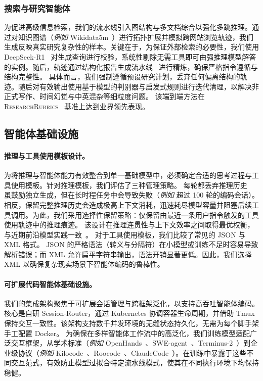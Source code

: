 \subsubsection{搜索与研究智能体}


为促进高级信息检索，我们的流水线引入图结构与多文档综合以强化多跳推理。通过对知识图谱（\textit{例如} Wikidata5m~\cite{wang2021kepler}）进行拓扑扩展并模拟跨网站浏览轨迹，我们生成反映真实研究复杂性的样本。关键在于，为保证外部检索的必要性，我们使用 DeepSeek-R1~\cite{Guo_2025} 对生成查询进行校验，系统性剔除无需工具即可由强推理模型解答的实例。随后，轨迹通过结构化报告生成流水线~\cite{hu2025stepdeepresearchtechnicalreport} 进行精炼，确保严格指令遵循与结构完整性。
具体而言，我们强制遵循预设研究计划，丢弃任何偏离结构的轨迹。随后对有效输出使用基于模型的判别器与启发式规则进行迭代清理，以解决非正式写作、时间幻觉与中英混杂等细粒度问题。
该端到端方法在 \textsc{ResearchRubrics}~\cite{sharma2025researchrubrics} 基准上达到业界领先表现。


\subsection{智能体基础设施}
\paragraph{推理与工具使用模板设计。}
为将推理与智能体能力有效整合到单一基础模型中，必须确定合适的思考过程与工具使用模板。针对推理模板，我们评估了三种管理策略。
每轮都丢弃推理历史~\cite{Guo_2025} 虽鼓励独立生成，但在长时程任务中会导致失败（\textit{例如} 超过 100 轮的编码会话）。相反，保留完整推理历史会造成极高上下文消耗，迅速耗尽模型容量并阻塞后续工具调用。为此，我们采用选择性保留策略：仅保留由最近一条用户指令触发的工具使用轨迹中的推理痕迹。
该设计在推理连贯性与上下文效率之间取得最优权衡，与近期前沿模型实践一致~\cite{yang2025qwen3technicalreport,liu2025deepseek}。
对于工具使用模板，我们比较了常见的 JSON 与 XML 格式。
JSON 的严格语法（转义与分隔符）在小模型或训练不足时容易导致解析错误；而 XML 允许扁平字符串输出，语法开销显著更低。因此，我们选择 XML 以确保复杂现实场景下智能体编码的鲁棒性。


\paragraph{可扩展代码智能体基础设施。}
我们的集成架构聚焦于可扩展会话管理与跨框架泛化，以支持高吞吐智能体编码。核心是自研 Session-Router，通过 Kubernetes 协调容器生命周期，并借助 Tmux 保持交互一致性。该架构支持数千并发环境的无缝状态持久化，无需为每个脚手架手工配置 Docker。
为确保在多样智能体工作流中的高泛化，我们训练模型适配广泛交互框架，从学术标准（\textit{例如} OpenHands~\cite{wang2024openhands}、SWE-agent~\cite{yang2024swe}、Terminus-2~\cite{terminalbench2025}）到企业级协议（\textit{例如} Kilocode~\cite{kilocode}、Roocode~\cite{roocode}、ClaudeCode~\cite{claudecode}）。在训练中暴露于这些不同交互范式，有效防止模型过拟合特定流水线模式，使其在不同执行环境下均保持稳健。


